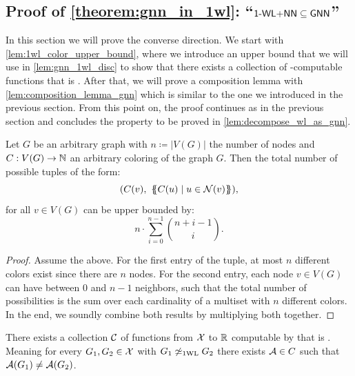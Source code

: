 \subsection{Proof of \cref*{theorem:gnn_in_1wl}: ``$\textsf{1-WL+NN} \subseteq \textsf{GNN}$''}
In this section we will prove the converse direction. We start with \cref{lem:1wl_color_upper_bound}, where we introduce an upper bound that we will use in \cref{lem:gnn_1wl_disc} to show that there exists a collection of \gnn-computable functions that is \wldisc. After that, we will prove a composition lemma with \cref{lem:composition_lemma_gnn} which is similar to the one we introduced in the previous section. From this point on, the proof continues as in the previous section and concludes the property to be proved in \cref{lem:decompose_wl_as_gnn}.

\begin{lemma}\label{lem:1wl_color_upper_bound}
    Let $G$ be an arbitrary graph with $n \coloneqq |V(G)|$ the number of nodes and $C: V(G) \rightarrow \mathbb{N}$ an arbitrary coloring of the graph $G$. Then the total number of possible tuples of the form:
    \begin{equation*}
        (C(v), \ \{\!\!\{ C(u) \mid u \in \mathcal{N}(v) \}\!\!\}),
    \end{equation*}
    for all $v \in V(G)$ can be upper bounded by:
    \begin{equation*}
        n \cdot \sum_{i=0}^{n-1} \binom{n+i -1}{i}.
    \end{equation*}
\end{lemma}

\begin{proof}
    Assume the above. For the first entry of the tuple, at most $n$ different colors exist since there are $n$ nodes. For the second entry, each node $v \in V(G)$ can have between $0$ and $n-1$ neighbors, such that the total number of possibilities is the sum over each cardinality of a multiset with $n$ different colors. In the end, we soundly combine both results by multiplying both together.
\end{proof}


\begin{lemma}\label{lem:gnn_1wl_disc}
    There exists a collection $\mathcal{C}$ of functions from $\mathcal{X}$ to $\mathbb{R}$ computable by \gnns that is \wldisc. Meaning for every $G_1, G_2 \in \mathcal{X}$ with $G_1 \not\simeq_{\text{1WL}} G_2$ there exists $\mathcal{A} \in C$ such that $\mathcal{A}(G_1) \neq \mathcal{A}(G_2)$.
\end{lemma}

